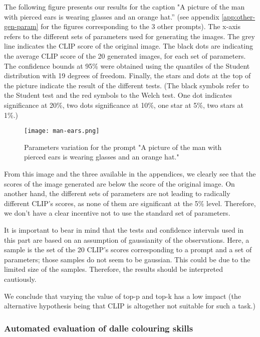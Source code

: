 \documentclass{article}
\begin{document}
\begin{multicols}{2}
The following figure presents our results for the caption "A
picture of the man with pierced ears is wearing
glasses and an orange hat.” (see appendix  \ref{app:other-gen-param} for the figures corresponding to the 3 other prompts). The x-axis refers to the different sets of parameters used for generating the images. The grey line indicates the CLIP score of the original image. The black dots are indicating the average CLIP score of the 20 generated images, for each set of parameters. The confidence bounds at 95\% were obtained using the quantiles of the Student distribution with 19 degrees of freedom. 
Finally, the stars and dots at the top of the picture indicate the result of the different tests. (The black symbols refer to the Student test and the red symbols to the Welch test. One dot indicates significance at 20\%, two dots significance at 10\%, one star at 5\%, two stars at 1\%.)

\begin{figure}[H]
    \centering
    \texttt{[image: man-ears.png]} %
    \caption{Parameters variation for the prompt "A picture of the man with pierced ears is wearing glasses and an orange hat."}
    \label{fig:gen-man-ears}
\end{figure}

From this image and the three available in the appendices, we clearly see that the scores of the image generated are below the score of the original image. On another hand, the different sets of parameters are not leading to radically different CLIP's scores, as none of them are significant at the 5\% level. Therefore, we don't have a clear incentive not to use the standard set of parameters.  

It is important to bear in mind that the tests and confidence intervals used in this part are based on an assumption of gaussianity of the observations. Here, a  sample is the set of the 20 CLIP's scores corresponding to a prompt and a set of parameters; those samples do not seem to be gaussian. This could be due to the limited size of the samples. Therefore, the results should be interpreted cautiously. 

We conclude that varying the value of top-p and top-k has a low impact (the alternative hypothesis being that CLIP is altogether not suitable for such a task.)

\subsubsection{Automated evaluation of \gls{dalle} colouring skills}


\end{multicols}
\end{document}
